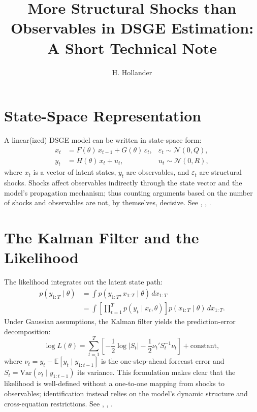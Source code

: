 \documentclass[11pt]{article}
\title{More Structural Shocks than Observables in DSGE Estimation: A Short Technical Note}
\author{H. Hollander}
\date{}
\begin{document}
\maketitle

\section{State-Space Representation}

A linear(ized) DSGE model can be written in state-space form:
\begin{align}
x_t &= F(\theta)\, x_{t-1} + G(\theta)\, \varepsilon_t, 
& \varepsilon_t \sim \mathcal{N}(0,Q), \label{eq:transition}\\
y_t &= H(\theta)\, x_t + u_t,
& u_t \sim \mathcal{N}(0,R), \label{eq:measurement}
\end{align}
where $x_t$ is a vector of latent states, $y_t$ are observables, and $\varepsilon_t$ are structural shocks.
Shocks affect observables indirectly through the state vector and the model's propagation mechanism; thus counting
arguments based on the number of shocks and observables are not, by themselves, decisive. See \citet{an2007},
\citet{herbst2015}, \citet{durbin2012}.

\section{The Kalman Filter and the Likelihood}

The likelihood integrates out the latent state path:
\begin{align}
p(y_{1:T}\mid \theta)
&= \int p(y_{1:T},x_{1:T}\mid \theta)\, dx_{1:T} \nonumber\\
&= \int \left[\prod_{t=1}^T p(y_t\mid x_t,\theta)\right] p(x_{1:T}\mid \theta)\, dx_{1:T}. \label{eq:likelihood_integral}
\end{align}
Under Gaussian assumptions, the Kalman filter yields the prediction-error decomposition:
\begin{equation}
\log L(\theta)
= \sum_{t=1}^{T} \left[
-\frac{1}{2}\log|S_t|
-\frac{1}{2}\nu_t' S_t^{-1}\nu_t
\right] + \text{constant}, \label{eq:kalman_ll}
\end{equation}
where $\nu_t = y_t - \mathbb{E}[y_t \mid y_{1:t-1}]$ is the one-step-ahead forecast error and
$S_t = \text{Var}(\nu_t \mid y_{1:t-1})$ its variance. This formulation makes clear that the likelihood is well-defined without a
one-to-one mapping from shocks to observables; identification instead relies on the model's dynamic structure and
cross-equation restrictions. See \citet{durbin2012}, \citet{hamilton1994}, \citet{an2007}.
\end{document}
